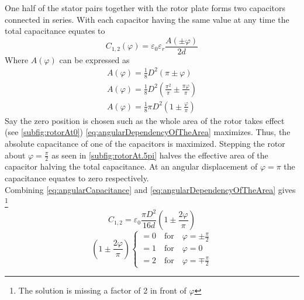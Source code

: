         One half of the stator pairs together with the rotor plate forms two capacitors connected in series. With each
        capacitor having the same value at any time the total capacitance equates to
        \begin{equation}
            C_{1,2}(\varphi) = \varepsilon_0 \varepsilon_r \frac{A(\pm\varphi)}{2d}
            \label{eq:angularCapacitance}
        \end{equation}
        Where \( A(\varphi) \) can be expressed as
        \begin{align}
            A(\varphi) = \frac{1}{8}D^2 \left( \pi \pm \varphi \right) \nonumber \\
            A(\varphi) = \frac{1}{8}D^2 \left( \frac{\pi^2}{\pi} \pm \frac{\pi\varphi}{\pi} \right) \nonumber \\
            A(\varphi) = \frac{1}{8} \pi D^2 \left( 1 \pm \frac{\varphi}{\pi}\right)
            \label{eq:angularDependencyOfTheArea}
        \end{align}
        Say the zero position is chosen such as the whole area of the rotor takes effect (see \cref{subfig:rotorAt0})
        \cref{eq:angularDependencyOfTheArea} maximizes. Thus, the absolute capacitance of one of the capacitors is maximized.
        Stepping the rotor about \( \varphi = \frac{\pi}{2} \) as seen in \cref{subfig:rotorAt.5pi} halves the
        effective area of the capacitor halving the total capacitance. At an angular displacement of \( \varphi = \pi \)
        the capacitance equates to zero respectively.\\
        Combining \cref{eq:angularCapacitance} and \cref{eq:angularDependencyOfTheArea} gives \footnote{The solution is missing a factor of 2 in front of \(\varphi\)}
        \begin{equation}
            C_{1,2} = \varepsilon_0 \frac{\pi D^2}{16d} \left( 1 \pm \frac{2\varphi}{\pi} \right)
        \end{equation}
        \begin{equation}
            \left(1 \pm \frac{2\varphi}{\pi} \right)
            \begin{cases}
                = 0 \quad \text{for} \quad \varphi = \pm \frac{\pi}{2} \nonumber \\
                = 1 \quad \text{for} \quad \varphi = 0 \nonumber \\
                = 2 \quad \text{for} \quad \varphi = \mp \frac{\pi}{2} \nonumber
            \end{cases}
        \end{equation}
